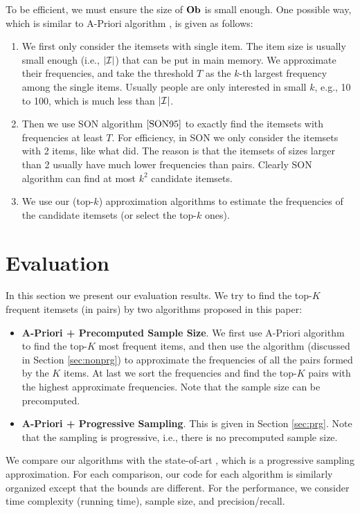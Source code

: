 \documentclass{article}
\begin{document}
To be efficient, we must ensure the size of $\mathbf{Ob}$ is small enough. One possible way, which is similar to A-Priori algorithm \cite{AIS93}, is given as follows:
\begin{enumerate}
\item We first only consider the itemsets with single item. The item size is usually small enough (i.e., $|\mathcal{I}|$) that can be put in main memory. We approximate their frequencies, and take the threshold $T$ as the $k$-th largest frequency among the single items. Usually people are only interested in small $k$, e.g., 10 to 100, which is much less than $|\mathcal{I}|$.
\item Then we use SON algorithm $\cite{SON95}$ to exactly find the itemsets with frequencies at least $T$. For efficiency, in SON we only consider the itemsets with 2 items, like what \cite{LRU14} did. The reason is that the itemsets of sizes larger than 2 usually have much lower frequencies than pairs. Clearly SON algorithm can find at most $k^2$ candidate itemsets.
\item We use our (top-$k$) approximation algorithms to estimate the frequencies of the candidate itemsets (or select the top-$k$ ones).
\end{enumerate}

\section{Evaluation}
In this section we present our evaluation results. 
We try to find the top-$K$ frequent itemsets (in pairs) by two algorithms proposed in this paper:
\begin{itemize}
\item {\bf A-Priori + Precomputed Sample Size}. We first use A-Priori algorithm to find the top-$K$ most frequent items, and then use the algorithm (discussed in Section \ref{sec:nonprg}) to approximate the frequencies of all the pairs formed by the $K$ items. At last we sort the frequencies and find the top-$K$ pairs with the highest approximate frequencies. Note that the sample size can be precomputed.
\item {\bf A-Priori + Progressive Sampling}. This is given in Section \ref{sec:prg}. Note that the sampling is progressive, i.e., there is no precomputed sample size.
\end{itemize}
We compare our algorithms with the state-of-art \cite{RU15}, which is a progressive sampling approximation. For each comparison, our code for each algorithm is similarly organized except that the bounds are different. 
For the performance, we consider time complexity (running time), sample size, and precision/recall.
\end{document}

